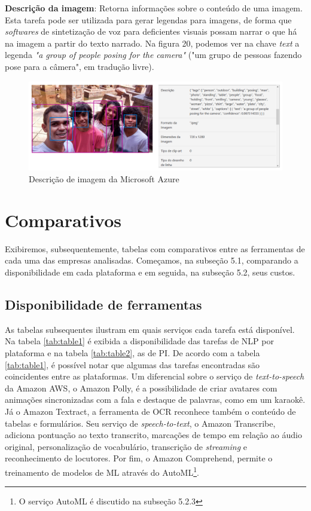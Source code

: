 \documentclass{article}
\begin{document}
\textbf{Descrição da imagem}: Retorna informações sobre o conteúdo de uma imagem. Esta tarefa pode ser utilizada para gerar legendas para imagens, de forma que \textit{softwares} de sintetização de voz para deficientes visuais possam narrar o que há na imagem a partir do texto narrado. Na figura 20, podemos ver na chave \textit{text} a legenda \textit{"a group of people posing for the camera"} ("um grupo de pessoas fazendo pose para a câmera", em tradução livre). \\
\begin{figure}[H]
    \centering
    \includegraphics[scale=0.25]{imagens/caption.png}
    \caption{Descrição de imagem da Microsoft Azure}
    \label{fig:captionalize}
\end{figure}{}

\section{Comparativos}

Exibiremos, subsequentemente, tabelas com comparativos entre as ferramentas de cada uma das empresas analisadas. Começamos, na subseção 5.1, comparando a disponibilidade em cada plataforma e em seguida, na subseção 5.2, seus custos.

\subsection{Disponibilidade de ferramentas}
 As tabelas subsequentes ilustram em quais serviços cada tarefa está disponível. Na tabela \ref{tab:table1} é exibida a disponibilidade das tarefas de NLP por plataforma e na tabela \ref{tab:table2}, as de PI. De acordo com a tabela \ref{tab:table1}, é possível notar que algumas das tarefas encontradas são coincidentes entre as plataformas. Um diferencial sobre o serviço de \textit{text-to-speech} da Amazon AWS, o Amazon Polly, é a possibilidade de criar avatares com animações sincronizadas com a fala e destaque de palavras, como em um karaokê. Já o Amazon Textract, a ferramenta de OCR reconhece também o conteúdo de tabelas e formulários. Seu serviço de \textit{speech-to-text}, o Amazon Transcribe, adiciona pontuação ao texto transcrito, marcações de tempo em relação ao áudio original, personalização de vocabulário, transcrição de \textit{streaming} e reconhecimento de locutores. Por fim, o Amazon Comprehend, permite o treinamento de modelos de ML através do AutoML\footnote{O serviço AutoML é discutido na subseção 5.2.3}.
 
\end{document}
